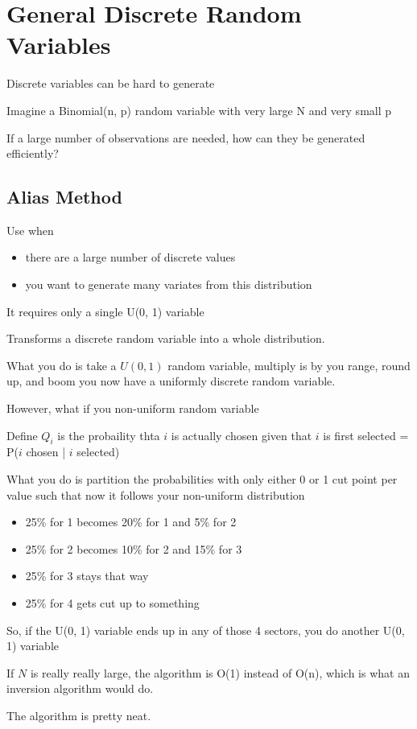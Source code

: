 \documentclass[fleqn]{report}
\begin{document}
\section{General Discrete Random Variables}
Discrete variables can be hard to generate 

Imagine a Binomial(n, p) random variable with very large N and very small p 

If a large number of observations are needed, how can they be generated 
efficiently?

\subsection{Alias Method}
Use when 
\begin{itemize}
    \item
    there are a large number of discrete values 
    \item 
    you want to generate many variates from this distribution 
\end{itemize} 

It requires only a single U(0, 1) variable 

Transforms a discrete random variable into a whole distribution. 

What you do is take a $U(0, 1)$ random variable, multiply is by 
you range, round up, and boom you now have a uniformly discrete random variable. 

However, what if you non-uniform random variable 

Define $Q_i$ is the probaility thta $i$ is actually chosen given that $i$ is 
first selected 
=
P($i$ chosen | $i$ selected)

What you do is partition the probabilities with only either 0 or 1 cut point 
per value such that now it follows your non-uniform distribution 

\begin{itemize}
    \item 
    25\% for 1 becomes 20\% for 1 and 5\% for 2 
    \item 
    25\% for 2 becomes 10\% for 2 and 15\% for 3
    \item 
    25\% for 3 stays that way 
    \item 
    25\% for 4 gets cut up to something 
\end{itemize}

So, if the U(0, 1) variable ends up in any of those 4 sectors, you do 
another U(0, 1) variable 

If $N$ is really really large, the algorithm is O(1) instead of O(n), which 
is what an inversion algorithm would do. 

The algorithm is pretty neat. 
\end{document}

